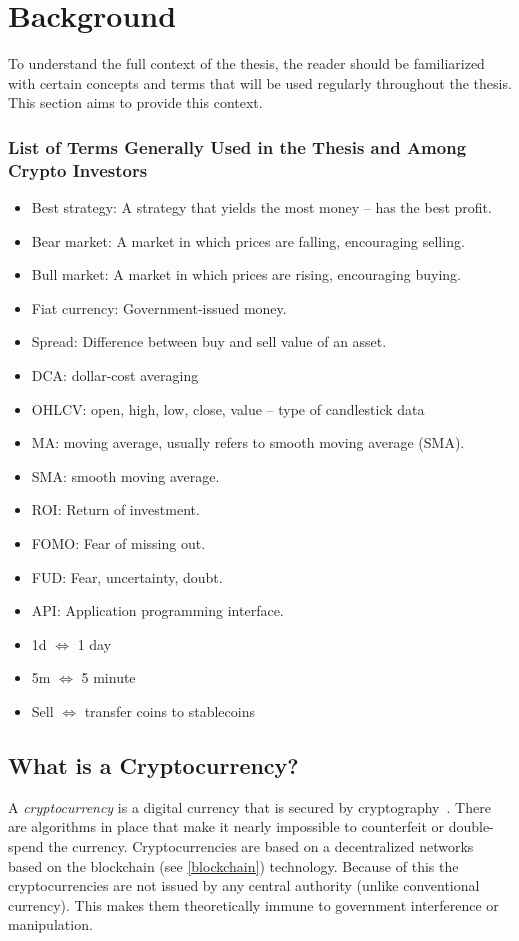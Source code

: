 \chapter{Background}
\label{chapter-background}

To understand the full context of the thesis, the reader should be familiarized with certain concepts and terms that will be used regularly throughout the thesis. This section aims to provide this context.

\subsection*{List of Terms Generally Used in the Thesis and Among Crypto Investors}
\begin{itemize}
    \item Best strategy: A strategy that yields the most money -- has the best profit.
    \item Bear market: A market in which prices are falling, encouraging selling.
    \item Bull market: A market in which prices are rising, encouraging buying.
    \item Fiat currency: Government-issued money.
    \item Spread: Difference between buy and sell value of an asset.
    \item DCA: dollar-cost averaging
    \item OHLCV: open, high, low, close, value -- type of candlestick data
    \item MA: moving average, usually refers to smooth moving average (SMA).
    \item SMA: smooth moving average.
    \item ROI: Return of investment.
    \item FOMO: Fear of missing out.
    \item FUD: Fear, uncertainty, doubt.
    \item API: Application programming interface.
    \item 1d $\Leftrightarrow$ 1 day
    \item 5m $\Leftrightarrow$ 5 minute
    \item Sell $\Leftrightarrow$ transfer coins to stablecoins
\end{itemize}

\section{What is a Cryptocurrency?}
A \emph{cryptocurrency} is a digital currency that is secured by cryptography~\cite{investopedia-cryptocurrency}. There are algorithms in place that make it nearly impossible to counterfeit or double-spend the currency. Cryptocurrencies are based on a decentralized networks based on the blockchain (see \ref{blockchain}) technology. Because of this the cryptocurrencies are not issued by any central authority (unlike conventional currency). This makes them theoretically immune to government interference or manipulation.

